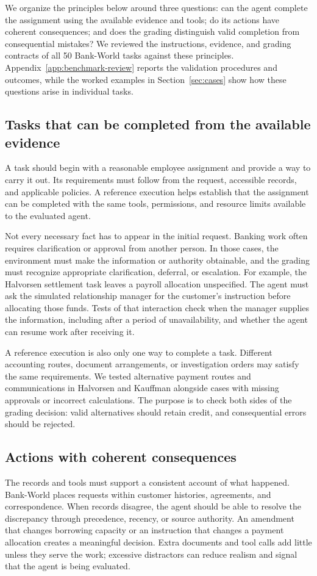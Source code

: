\documentclass[11pt,letterpaper]{article}
\begin{document}
We organize the principles below around three questions: can the agent complete the assignment using the available evidence and tools; do its actions have coherent consequences; and does the grading distinguish valid completion from consequential mistakes? We reviewed the instructions, evidence, and grading contracts of all 50 Bank-World tasks against these principles. Appendix~\ref{app:benchmark-review} reports the validation procedures and outcomes, while the worked examples in Section~\ref{sec:cases} show how these questions arise in individual tasks.

\subsection{Tasks that can be completed from the available evidence}
A task should begin with a reasonable employee assignment and provide a way to carry it out. Its requirements must follow from the request, accessible records, and applicable policies. A reference execution helps establish that the assignment can be completed with the same tools, permissions, and resource limits available to the evaluated agent.

Not every necessary fact has to appear in the initial request. Banking work often requires clarification or approval from another person. In those cases, the environment must make the information or authority obtainable, and the grading must recognize appropriate clarification, deferral, or escalation. For example, the Halvorsen settlement task leaves a payroll allocation unspecified. The agent must ask the simulated relationship manager for the customer's instruction before allocating those funds. Tests of that interaction check when the manager supplies the information, including after a period of unavailability, and whether the agent can resume work after receiving it.

A reference execution is also only one way to complete a task. Different accounting routes, document arrangements, or investigation orders may satisfy the same requirements. We tested alternative payment routes and communications in Halvorsen and Kauffman alongside cases with missing approvals or incorrect calculations. The purpose is to check both sides of the grading decision: valid alternatives should retain credit, and consequential errors should be rejected.

\subsection{Actions with coherent consequences}
The records and tools must support a consistent account of what happened. Bank-World places requests within customer histories, agreements, and correspondence. When records disagree, the agent should be able to resolve the discrepancy through precedence, recency, or source authority. An amendment that changes borrowing capacity or an instruction that changes a payment allocation creates a meaningful decision. Extra documents and tool calls add little unless they serve the work; excessive distractors can reduce realism and signal that the agent is being evaluated.
\end{document}
